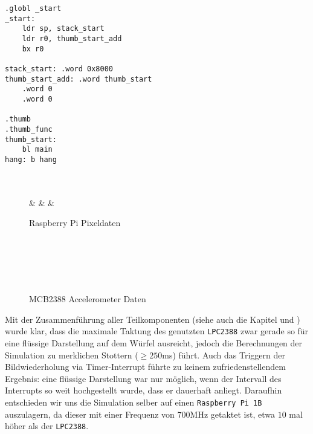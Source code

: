 \begin{lstlisting}[language={[ARM]{Assembler}}, caption={ARM ASM startup code}, label={code.sph.rp.startup}]
.globl _start
_start:
	ldr sp, stack_start
	ldr r0, thumb_start_add
	bx r0

stack_start: .word 0x8000
thumb_start_add: .word thumb_start
	.word 0
	.word 0

.thumb
.thumb_func
thumb_start:
	bl main
hang: b hang

\end{lstlisting}

\begin{figure}
	\begin{bytefield}[bitwidth=1.1em]{32}
		 \\
		 \\
		 &  &  &  \\
	\end{bytefield}
	\caption{Raspberry Pi Pixeldaten}
	\label{fig:sph:rp:pixels}
\end{figure}

\begin{figure}
	\begin{bytefield}[bitwidth=1.1em]{32}
		 \\
		 \\
		 \\
		 \\
	\end{bytefield}
	\caption{MCB2388 Accelerometer Daten}
	\label{fig:sph:rp:acc_data}
\end{figure}

Mit der Zusammenführung aller Teilkomponenten (siehe auch die Kapitel  und ) wurde klar, dass die maximale Taktung des genutzten \texttt{LPC2388} zwar gerade so für eine flüssige Darstellung auf dem Würfel ausreicht, jedoch die Berechnungen der Simulation zu merklichen Stottern ($\geq 250$ms) führt. Auch das Triggern der Bildwiederholung via Timer-Interrupt führte zu keinem zufriedenstellendem Ergebnis: eine flüssige Darstellung war nur möglich, wenn der Intervall des Interrupts so weit hochgestellt wurde, dass er dauerhaft anliegt. Daraufhin entschieden wir uns die Simulation selber auf einen \texttt{Raspberry Pi 1B} auszulagern, da dieser mit einer Frequenz von $700$MHz getaktet ist, etwa $10$ mal höher als der \texttt{LPC2388}.

